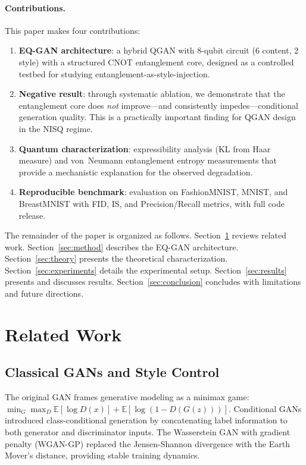 \documentclass[twocolumn]{article}
\begin{document}
\paragraph{Contributions.} This paper makes four contributions:
\begin{enumerate}
  \item \textbf{EQ-GAN architecture}: a hybrid QGAN with 8-qubit circuit
    (6 content, 2 style) with a structured CNOT entanglement core, designed
    as a controlled testbed for studying entanglement-as-style-injection.
  \item \textbf{Negative result}: through systematic ablation, we demonstrate
    that the entanglement core does \emph{not} improve—and consistently
    impedes—conditional generation quality. This is a practically important
    finding for QGAN design in the NISQ regime.
  \item \textbf{Quantum characterization}: expressibility analysis (KL from
    Haar measure) and von~Neumann entanglement entropy measurements that
    provide a mechanistic explanation for the observed degradation.
  \item \textbf{Reproducible benchmark}: evaluation on FashionMNIST, MNIST, and
    BreastMNIST with FID, IS, and Precision/Recall metrics, with full code release.
\end{enumerate}

The remainder of the paper is organized as follows. Section~\ref{sec:related}
reviews related work. Section~\ref{sec:method} describes the EQ-GAN
architecture. Section~\ref{sec:theory} presents the theoretical
characterization. Section~\ref{sec:experiments} details the experimental
setup. Section~\ref{sec:results} presents and discusses results.
Section~\ref{sec:conclusion} concludes with limitations and future directions.

\section{Related Work}
\label{sec:related}

\subsection{Classical GANs and Style Control}

The original GAN \cite{goodfellow2014generative} frames generative modeling
as a minimax game: $\min_G \max_D \mathbb{E}[\log D(x)] +
\mathbb{E}[\log(1-D(G(z)))]$. Conditional GANs \cite{mirza2014conditional}
introduced class-conditional generation by concatenating label information to
both generator and discriminator inputs. The Wasserstein GAN with gradient
penalty (WGAN-GP) \cite{gulrajani2017improved} replaced the Jensen-Shannon
divergence with the Earth Mover's distance, providing stable training dynamics.
\end{document}
